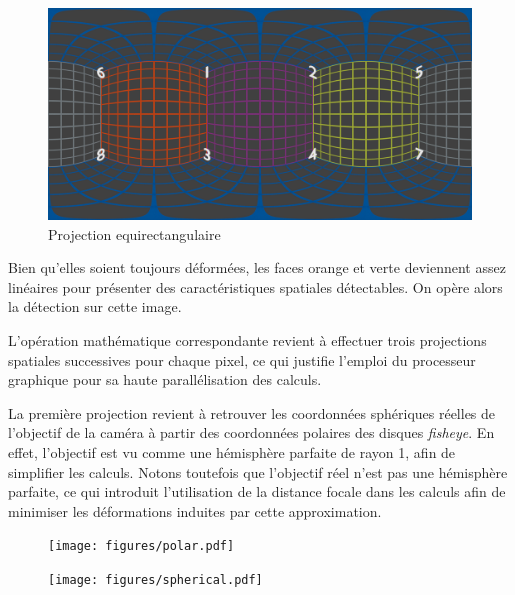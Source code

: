 			\begin{figure}[H]
			{
				\centering
				\includegraphics[width=1\textwidth]{figures/equirect.png}
				\caption{Projection equirectangulaire}
				\label{fig:equirect}
			}
			\end{figure}
			Bien qu'elles soient toujours déformées, les faces orange et verte deviennent assez linéaires pour présenter des caractéristiques spatiales détectables. On opère alors la détection sur cette image.
			\par
			L'opération mathématique correspondante revient à effectuer trois projections spatiales successives pour chaque pixel, ce qui justifie l'emploi du processeur graphique pour sa haute parallélisation des calculs.
			\par
			La première projection revient à retrouver les coordonnées sphériques réelles de l'objectif de la caméra à partir des coordonnées polaires des disques \emph{fisheye}. En effet, l'objectif est vu comme une hémisphère parfaite de rayon 1, afin de simplifier les calculs. Notons toutefois que l'objectif réel n'est pas une hémisphère parfaite, ce qui introduit l'utilisation de la distance focale dans les calculs afin de minimiser les déformations induites par cette approximation.
			\begin{figure}[htb]
				\centering
				\begin{minipage}{.5\textwidth}
					\centering
					\texttt{[image: figures/polar.pdf]}
					\label{fig:pcart1}
				\end{minipage}%
				\begin{minipage}{.5\textwidth}
					\centering
					\texttt{[image: figures/spherical.pdf]}
					\label{fig:psph}
				\end{minipage}
			\end{figure}
